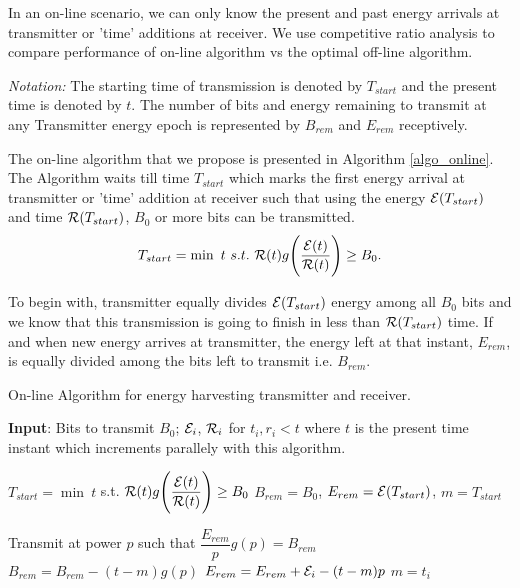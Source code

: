 In an on-line scenario, we can only know the present and past energy arrivals at transmitter or 'time' additions at receiver. We use competitive ratio analysis to compare performance of on-line algorithm vs the optimal off-line algorithm.  
 
\textit{Notation:} The starting time of transmission is denoted by $T_{start}$ and the present time is denoted by $t$. The number of bits and energy remaining to transmit at any Transmitter energy epoch is represented by $B_{rem}$ and $E_{rem}$ receptively.

The on-line algorithm that we propose is presented in Algorithm \ref{algo_online}. The Algorithm waits till time $T_{start}$ which marks the first energy arrival at transmitter or 'time' addition at receiver such that using the energy $\mathcal{E}(T_{start})$ and time $\mathcal{R}(T_{start})$, $B_0$ or more bits can be transmitted.
\begin{equation}
T_{start}=\min\ t \ s.t.\  \TRx(t)g\Bigg{(} \dfrac{\ETx(t)}{\TRx(t)}\Bigg{)}\ge B_0.\label{online_T_start}
\end{equation}

To begin with, transmitter equally divides $\mathcal{E}(T_{start})$ energy among all $B_0$ bits and we know that this transmission is going to finish in less than $\mathcal{R}(T_{start})$ time. If and when new energy arrives at transmitter, the energy left at that instant, $E_{rem}$, is equally divided among the bits left to transmit i.e. $B_{rem}$.

\begin{algorithm}
\caption {On-line Algorithm for energy harvesting transmitter and receiver.}
\footnotesize
\label{algo_online}
\begin{algorithmic}[1]
\State \textbf{Input}: Bits to transmit $B_0$; $\mathcal{E}_i$, $\mathcal{R}_i$ for $t_i,r_i<t$ where $t$ is the present time instant which increments parallely with this algorithm. 

\State $T_{start}=\min\ t$ s.t. $\mathcal{R}(t)g\Bigg{(} \dfrac{\mathcal{E}(t)}{\mathcal{R}(t)}\Bigg{)}\ge B_0$
\State $B_{rem}=B_0$, $E_{rem}=\mathcal{E}(T_{start})$, $m=T_{start}$

\Do
	\State Transmit at power $p$ such that $\dfrac{E_{rem}}{p} g(p)= B_{rem}$
		\State $B_{rem}=B_{rem}-(t-m)g(p)$
		\State $E_{rem}=E_{rem}+\mathcal{E}_i-(t-m)p$
		\State $m=t_i$
	\EndIf
{}
\end{algorithmic}
\end{algorithm}

